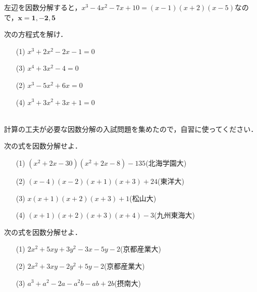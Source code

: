 \documentclass[a4paper,11pt]{ltjsarticle}
\begin{document}
\ans 
左辺を因数分解すると，$x^3-4x^2-7x+10=(x-1)(x+2)(x-5)$なので，$\boldsymbol{x=1,-2,5}$
\begin{toi}
次の方程式を解け．\\[5pt]
\begin{minipage}{0.5\linewidth}
\begin{itemize}
    \item [(1)]$x^3+2x^2-2x-1=0$
    \item [(3)]$x^4+3x^2-4=0$
\end{itemize}
\end{minipage}
\begin{minipage}{0.5\linewidth}
\begin{itemize}
    \item [(2)]$x^3-5x^2+6x=0$
    \item [(4)]$x^3+3x^2+3x+1=0$
\end{itemize}
\end{minipage}
\end{toi}
　\\
計算の工夫が必要な因数分解の入試問題を集めたので，自習に使ってください．
\begin{toi}
次の式を因数分解せよ．
\begin{itemize}
    \item [(1)]$(x^2+2x-30)(x^2+2x-8)-135$\hfill(北海学園大)
    \item [(2)]$(x-4)(x-2)(x+1)(x+3)+24$\hfill(東洋大)
    \item [(3)]$x(x+1)(x+2)(x+3)+1$\hfill(松山大)
    \item [(4)]$(x+1)(x+2)(x+3)(x+4)-3$\hfill(九州東海大)
\end{itemize}
\end{toi}
\begin{toi}
次の式を因数分解せよ．
\begin{itemize}
    \item [(1)]$2x^2+5xy+3y^2-3x-5y-2$\hfill(京都産業大)
    \item [(2)]$2x^2+3xy-2y^2+5y-2$\hfill(京都産業大)
        \item [(3)]$a^3+a^2-2a-a^2b-ab+2b$\hfill(摂南大)
\end{itemize}
\end{toi}
\end{document}
